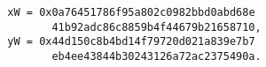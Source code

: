 \begin{verbatim}
                     xW = 0x0a76451786f95a802c0982bbd0abd68e
                            41b92adc86c8859b4f44679b21658710,
                     yW = 0x44d150c8b4bd14f79720d021a839e7b7
                            eb4ee43844b30243126a72ac2375490a.
\end{verbatim}
